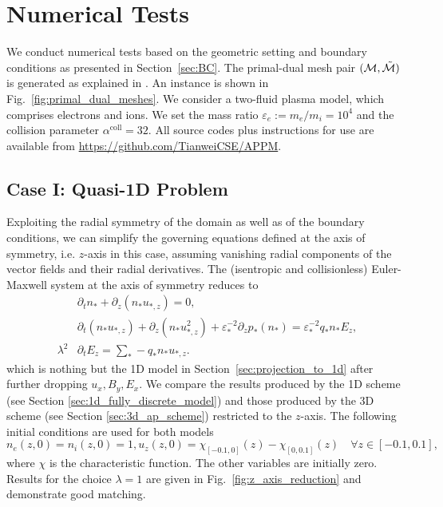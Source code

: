 \documentclass{article}
\begin{document}
\section{Numerical Tests} \label{sec:numerical_experiment}

We conduct numerical tests based on the geometric setting and boundary conditions as
presented in Section~\ref{sec:BC}. The primal-dual mesh pair
$(\mathcal{M}, \Tilde{\mathcal{M}})$ is generated as explained in
\cite[][Ch. 1]{fuchs_2021}. An instance is shown in Fig.~\ref{fig:primal_dual_meshes}. We
consider a two-fluid plasma model, which comprises electrons and ions. We set the mass
ratio $\varepsilon_e := m_e / m_i = 10^4$ and the collision parameter
$\alpha^\text{coll} = 32$. All source codes plus instructions for use are available from
\url{https://github.com/TianweiCSE/APPM}.

\subsection{Case I: Quasi-1D Problem}

Exploiting the radial symmetry of the domain as well as of the boundary conditions, we can
simplify the governing equations defined at the axis of symmetry, i.e. $z$-axis in this
case, assuming vanishing radial components of the vector fields and their radial
derivatives. The (isentropic and collisionless) Euler-Maxwell system at the axis of
symmetry reduces to
\begin{align*}
    &\partial_t n_* + \partial_z(n_*u_{*,z}) = 0, \\
    &\partial_t (n_* u_{*,z}) + \partial_z(n_*u_{*,z}^2) + \varepsilon_*^{-2} \partial_z p_*(n_*) = \varepsilon_*^{-2}q_*n_*E_z, \\
    \lambda^2 &\partial_t E_z = \sum_* - q_* n_* u_{*,z}.
\end{align*}
which is nothing but the 1D model in Section~\ref{sec:projection_to_1d} after further
dropping $u_x, B_y, E_x$. We compare the results produced by the 1D scheme (see Section
\ref{sec:1d_fully_discrete_model}) and those produced by the 3D scheme (see Section
\ref{sec:3d_ap_scheme}) restricted to the $z$-axis. The following initial conditions are
used for both models
\begin{equation*}
    n_e(z,0) = n_i(z,0) = 1, u_z(z,0) = \chi_{[-0.1,0]}(z) - \chi_{[0,0.1]}(z)\quad \forall z \in [-0.1,0.1],
\end{equation*}
where $\chi$ is the characteristic function. The other variables are initially
zero. Results for the choice $\lambda = 1$ are given in Fig.~\ref{fig:z_axis_reduction}
and demonstrate good matching.
\end{document}
